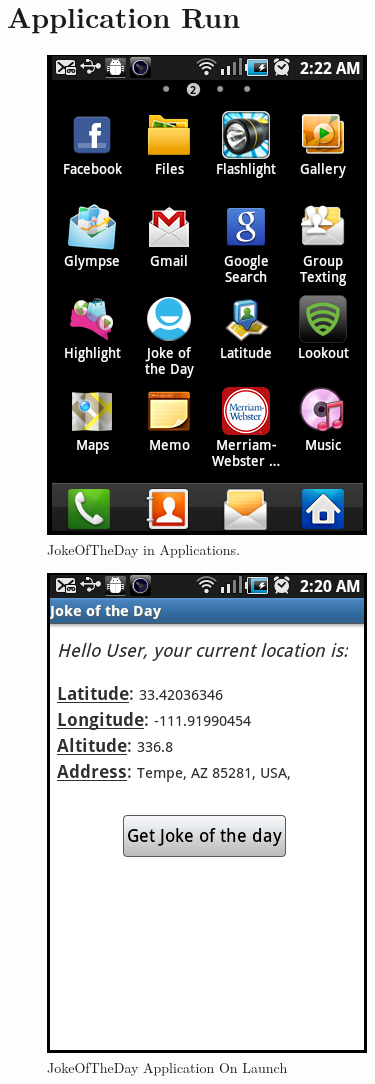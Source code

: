 \documentclass[11pt]{report}
\begin{document}
\section{Application Run}
\begin{figure}[htp]
\label{fig:img1}
\caption{JokeOfTheDay in Applications.}
\centerline{\includegraphics[scale=0.6]{1_JokeOfTheDay_in_APPLICATIONS}}
\end{figure}
\begin{figure}
\label{fig:img2}
\caption{JokeOfTheDay Application On Launch}
\centerline{\includegraphics[scale=0.6]{2_Launched_JokeOfTheDay_Application}}
\end{figure}
\end{document}
